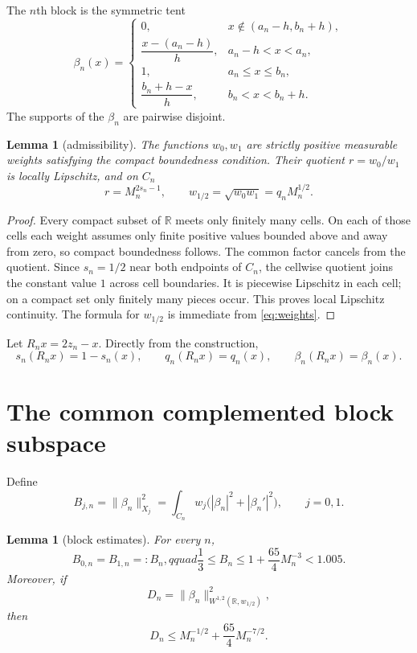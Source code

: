 \documentclass[11pt]{article}
\newtheorem{lemma}[theorem]{Lemma}
\theoremstyle{remark}
\newcommand{\R}{\mathbb R}
\begin{document}
The $n$th block is the symmetric tent
\begin{equation}\label{eq:block}
\beta_n(x)=
\begin{cases}
0,&x\notin(a_n-h,b_n+h),\\
\dfrac{x-(a_n-h)}h,&a_n-h<x<a_n,\\
1,&a_n\leq x\leq b_n,\\
\dfrac{b_n+h-x}h,&b_n<x<b_n+h.
\end{cases}
\end{equation}
The supports of the $\beta_n$ are pairwise disjoint.

\begin{lemma}[admissibility]\label{lem:admissible}
The functions $w_0,w_1$ are strictly positive measurable weights satisfying
the compact boundedness condition.  Their quotient $r=w_0/w_1$ is locally
Lipschitz, and on $C_n$
\[
 r=M_n^{2s_n-1},\qquad w_{1/2}=\sqrt{w_0w_1}=q_nM_n^{1/2}.
\]
\end{lemma}

\begin{proof}
Every compact subset of $\R$ meets only finitely many cells.  On each of those
cells each weight assumes only finite positive values bounded above and away
from zero, so compact boundedness follows.  The common factor cancels from
the quotient.  Since $s_n=1/2$ near both endpoints of $C_n$, the cellwise
quotient joins the constant value $1$ across cell boundaries.  It is
piecewise Lipschitz in each cell; on a compact set only finitely many pieces
occur.  This proves local Lipschitz continuity.  The formula for $w_{1/2}$ is
immediate from \eqref{eq:weights}.
\end{proof}

Let $R_nx=2z_n-x$.  Directly from the construction,
\begin{equation}\label{eq:reflection}
 s_n(R_nx)=1-s_n(x),\qquad q_n(R_nx)=q_n(x),\qquad
 \beta_n(R_nx)=\beta_n(x).
\end{equation}

\section{The common complemented block subspace}

Define
\[
 B_{j,n}=\|\beta_n\|_{X_j}^2
 =\int_{C_n}w_j\bigl(|\beta_n|^2+|\beta_n'|^2\bigr),
 \qquad j=0,1.
\]

\begin{lemma}[block estimates]\label{lem:block-estimates}
For every $n$,
\begin{equation}\label{eq:B-bounds}
 B_{0,n}=B_{1,n}=:B_n,qquad
 \frac13\leq B_n\leq1+\frac{65}{4}M_n^{-3}<1.005.
\end{equation}
Moreover, if
\[
 D_n=\|\beta_n\|_{W^{1,2}(\R,w_{1/2})}^2,
\]
then
\begin{equation}\label{eq:D-bound}
 D_n\leq M_n^{-1/2}+\frac{65}{4}M_n^{-7/2}.
\end{equation}
\end{lemma}
\end{document}
